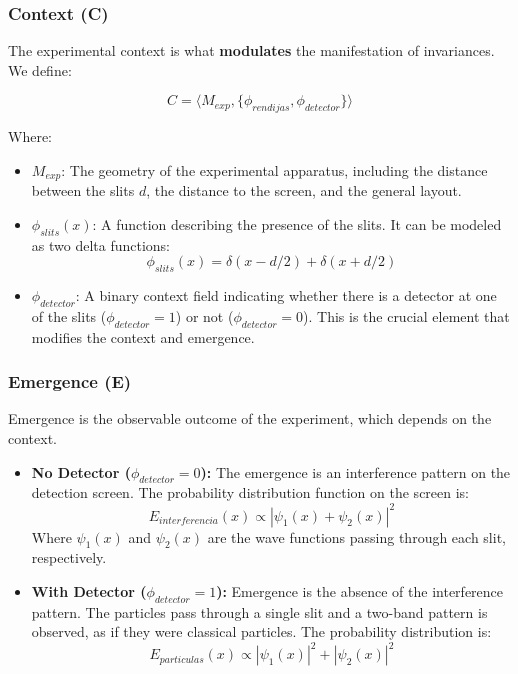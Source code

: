 \documentclass{article}
\begin{document}
\subsubsection{Context (C)}

The experimental context is what \textbf{modulates} the manifestation of invariances. We define:

$$ C = \langle M_{exp}, \{ \phi_{rendijas}, \phi_{detector} \} \rangle $$

Where:

\begin{itemize}
    \item \(M_{exp}\): The geometry of the experimental apparatus, including the distance between the slits \(d\), the distance to the screen, and the general layout.
    \item \(\phi_{slits}(x)\): A function describing the presence of the slits. It can be modeled as two delta functions:
$$ \phi_{slits}(x) = \delta(x - d/2) + \delta(x + d/2) $$
    \item \(\phi_{detector}\): A binary context field indicating whether there is a detector at one of the slits (\(\phi_{detector} = 1\)) or not (\(\phi_{detector} = 0\)). This is the crucial element that modifies the context and emergence.
\end{itemize}

\subsubsection{Emergence (E)}

Emergence is the observable outcome of the experiment, which depends on the context.

\begin{itemize}
 \item \textbf{No Detector (\(\phi_{detector} = 0\)):} The emergence is an interference pattern on the detection screen. The probability distribution function on the screen is:
    $$ E_{interferencia}(x) \propto |\psi_1(x) + \psi_2(x)|^2 $$
Where \(\psi_1(x)\) and \(\psi_2(x)\) are the wave functions passing through each slit, respectively.
\item \textbf{With Detector (\(\phi_{detector} = 1\)):} Emergence is the absence of the interference pattern. The particles pass through a single slit and a two-band pattern is observed, as if they were classical particles. The probability distribution is:
      $$ E_{particulas}(x) \propto |\psi_1(x)|^2 + |\psi_2(x)|^2$$
\end{itemize}
\end{document}
